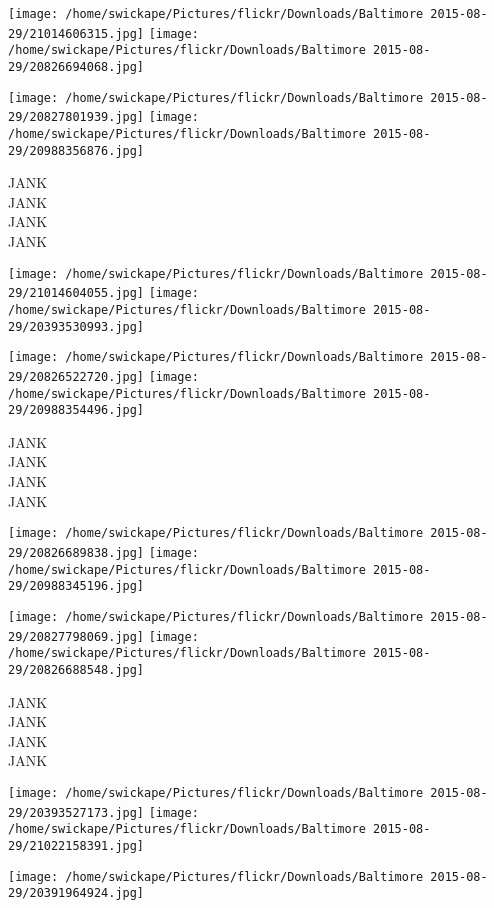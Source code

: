 \documentclass[10pt,letterpaper]{article}
\begin{document}
\texttt{[image: /home/swickape/Pictures/flickr/Downloads/Baltimore 2015-08-29/21014606315.jpg]}
\texttt{[image: /home/swickape/Pictures/flickr/Downloads/Baltimore 2015-08-29/20826694068.jpg]}

\texttt{[image: /home/swickape/Pictures/flickr/Downloads/Baltimore 2015-08-29/20827801939.jpg]}
\texttt{[image: /home/swickape/Pictures/flickr/Downloads/Baltimore 2015-08-29/20988356876.jpg]}

JANK\\
JANK\\
JANK\\
JANK
\pagebreak

\texttt{[image: /home/swickape/Pictures/flickr/Downloads/Baltimore 2015-08-29/21014604055.jpg]}
\texttt{[image: /home/swickape/Pictures/flickr/Downloads/Baltimore 2015-08-29/20393530993.jpg]}

\texttt{[image: /home/swickape/Pictures/flickr/Downloads/Baltimore 2015-08-29/20826522720.jpg]}
\texttt{[image: /home/swickape/Pictures/flickr/Downloads/Baltimore 2015-08-29/20988354496.jpg]}

JANK\\
JANK\\
JANK\\
JANK
\pagebreak

\texttt{[image: /home/swickape/Pictures/flickr/Downloads/Baltimore 2015-08-29/20826689838.jpg]}
\texttt{[image: /home/swickape/Pictures/flickr/Downloads/Baltimore 2015-08-29/20988345196.jpg]}

\texttt{[image: /home/swickape/Pictures/flickr/Downloads/Baltimore 2015-08-29/20827798069.jpg]}
\texttt{[image: /home/swickape/Pictures/flickr/Downloads/Baltimore 2015-08-29/20826688548.jpg]}

JANK\\
JANK\\
JANK\\
JANK
\pagebreak

\texttt{[image: /home/swickape/Pictures/flickr/Downloads/Baltimore 2015-08-29/20393527173.jpg]}
\texttt{[image: /home/swickape/Pictures/flickr/Downloads/Baltimore 2015-08-29/21022158391.jpg]}

\vspace{0.25in}
\texttt{[image: /home/swickape/Pictures/flickr/Downloads/Baltimore 2015-08-29/20391964924.jpg]}
\end{document}
